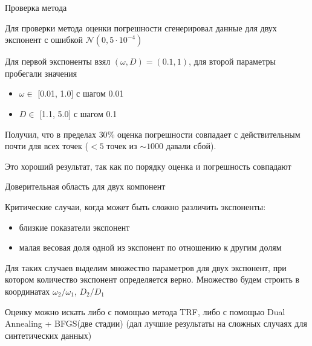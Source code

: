 \documentclass{beamer}      %
\begin{document}
    \begin{frame}{Проверка метода}

        Для проверки метода оценки погрешности сгенерировал данные для
        двух экспонент с ошибкой $\mathcal{N}(0, 5\cdot 10^{-4})$

        \hspace{1pt}

        Для первой экспоненты взял $(\omega, D) = (0.1, 1)$, для второй
        параметры пробегали значения

        \begin{itemize}
            \item $\omega \in $ [0.01, 1.0] с шагом 0.01
            \item $D \in $  [1.1, 5.0] с шагом 0.1
        \end{itemize}


        Получил, что в пределах $30\%$ оценка погрешности совпадает с действительным почти для всех точек
        ($< 5$ точек из $\sim 1000$ давали сбой).

        \hspace{1pt}

        Это хороший результат, так как по порядку оценка и погрешность совпадают
    \end{frame}




    \begin{frame}{Доверительная область для двух компонент}

        Критические случаи, когда может быть сложно различить экспоненты:

        \begin{itemize}
            \item близкие показатели экспонент
            \item малая весовая доля одной из экспонент по отношению к другим долям
        \end{itemize}

        Для таких случаев выделим множество параметров для двух экспонент, при котором
        количество экспонент определяется верно. Множество будем строить в координатах
        $\omega_2 / \omega_1$, $D_2/ D_1$


        \hspace{1pt}

        Оценку можно искать либо с помощью метода TRF, либо
        с помощью Dual Annealing + BFGS(две стадии)
        (дал лучшие результаты на сложных случаях для синтетических данных)

    \end{frame}
\end{document}

